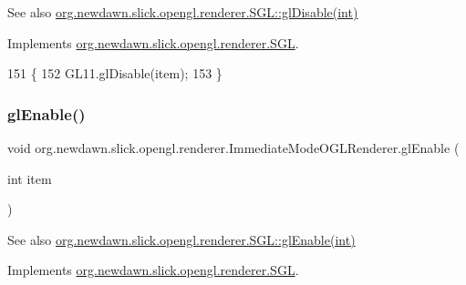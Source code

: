 \begin{DoxySeeAlso}{See also}
\mbox{\hyperlink{interfaceorg_1_1newdawn_1_1slick_1_1opengl_1_1renderer_1_1_s_g_l_a3b47b402f84bc1404e6b218264981bb5}{org.\+newdawn.\+slick.\+opengl.\+renderer.\+S\+G\+L\+::gl\+Disable(int)}} 
\end{DoxySeeAlso}


Implements \mbox{\hyperlink{interfaceorg_1_1newdawn_1_1slick_1_1opengl_1_1renderer_1_1_s_g_l_a3b47b402f84bc1404e6b218264981bb5}{org.\+newdawn.\+slick.\+opengl.\+renderer.\+S\+GL}}.


\begin{DoxyCode}
151                                     \{
152         GL11.glDisable(item);
153     \}
\end{DoxyCode}
\mbox{\label{classorg_1_1newdawn_1_1slick_1_1opengl_1_1renderer_1_1_immediate_mode_o_g_l_renderer_ac8ffe84c76858531fd8c872bef726bb9}} 
\subsubsection{\texorpdfstring{gl\+Enable()}{glEnable()}}
{\footnotesize\ttfamily void org.\+newdawn.\+slick.\+opengl.\+renderer.\+Immediate\+Mode\+O\+G\+L\+Renderer.\+gl\+Enable (\begin{DoxyParamCaption}\item[{int}]{item }\end{DoxyParamCaption})\hspace{0.3cm}{\ttfamily [inline]}}

\begin{DoxySeeAlso}{See also}
\mbox{\hyperlink{interfaceorg_1_1newdawn_1_1slick_1_1opengl_1_1renderer_1_1_s_g_l_a35991f93081980b303d6ccc5bd88c8da}{org.\+newdawn.\+slick.\+opengl.\+renderer.\+S\+G\+L\+::gl\+Enable(int)}} 
\end{DoxySeeAlso}


Implements \mbox{\hyperlink{interfaceorg_1_1newdawn_1_1slick_1_1opengl_1_1renderer_1_1_s_g_l_a35991f93081980b303d6ccc5bd88c8da}{org.\+newdawn.\+slick.\+opengl.\+renderer.\+S\+GL}}.


